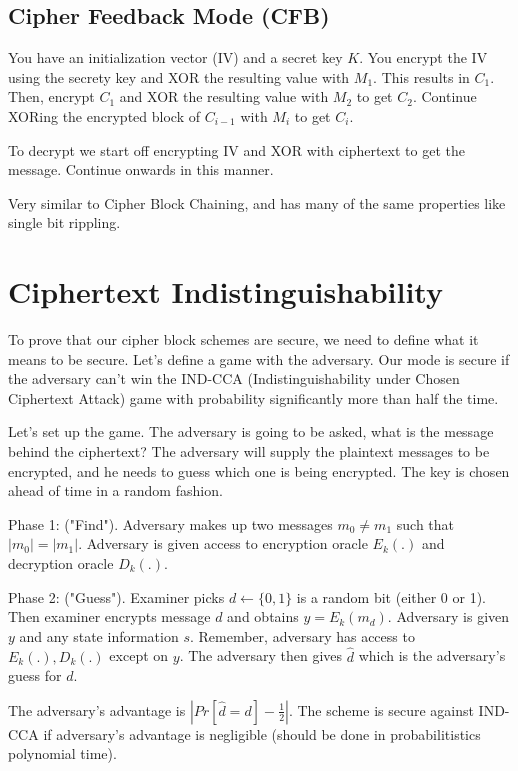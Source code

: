 \documentclass[psamsfonts]{amsart}
\begin{document}
\subsection{Cipher Feedback Mode (CFB)}

You have an initialization vector (IV) and a secret key $K$. You encrypt the IV using the secrety key and XOR the resulting value with $M_1$. This results in $C_1$. Then, encrypt $C_1$ and XOR the resulting value with $M_2$ to get $C_2$. Continue XORing the encrypted block of $C_{i-1}$ with $M_i$ to get $C_i$.

To decrypt we start off encrypting IV and XOR with ciphertext to get the message. Continue onwards in this manner.

Very similar to Cipher Block Chaining, and has many of the same properties like single bit rippling.

\section{Ciphertext Indistinguishability}

To prove that our cipher block schemes are secure, we need to define what it means to be secure. Let's define a game with the adversary. Our mode is secure if the adversary can't win the IND-CCA (Indistinguishability under Chosen Ciphertext Attack) game with probability significantly more than half the time.

Let's set up the game. The adversary is going to be asked, what is the message behind the ciphertext? The adversary will supply the plaintext messages to be encrypted, and he needs to guess which one is being encrypted. The key is chosen ahead of time in a random fashion.

Phase 1: ("Find"). Adversary makes up two messages $m_0 \neq m_1$ such that $|m_0| = |m_1|$. Adversary is given access to encryption oracle $E_k(.)$ and decryption oracle $D_k(.)$.

Phase 2: ("Guess"). Examiner picks $d \leftarrow \{0, 1\}$ is a random bit (either 0 or 1). Then examiner encrypts message $d$ and obtains $y = E_k (m_d)$. Adversary is given $y$ and any state information $s$. Remember, adversary has access to $E_k(.), D_k(.)$ except on $y$. The adversary then gives $\hat{d}$ which is the adversary's guess for $d$.

The adversary's advantage is $|Pr[\hat{d} = d] - \frac{1}{2} |$. The scheme is secure against IND-CCA if adversary's advantage is negligible (should be done in probabilitistics polynomial time).
\end{document}

